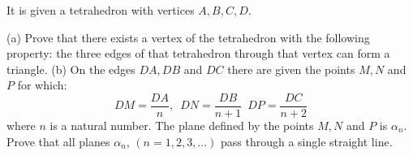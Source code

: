 It is given a tetrahedron with vertices $A,B,C,D$.

(a) Prove that there exists a vertex of the tetrahedron with the following property: the three edges of that tetrahedron through that vertex can form a triangle.
(b) On the edges $DA,DB$ and $DC$ there are given the points $M,N$ and $P$ for which:
$$DM=\frac{DA}n,\enspace DN=\frac{DB}{n+1}\enspace DP=\frac{DC}{n+2}$$where $n$ is a natural number. The plane defined by the points $M,N$ and $P$ is $\alpha_n$. Prove that all planes $\alpha_n$, $(n=1,2,3,\ldots)$ pass through a single straight line.